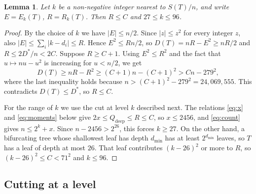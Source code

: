 \documentclass[11pt]{amsart}
\newtheorem{lemma}[theorem]{Lemma}
\theoremstyle{remark}
\begin{document}
\begin{lemma}\label{lem:center}
Let $k$ be a non-negative integer nearest to $S(T)/n$, and write $E=E_k(T)$, $R=R_k(T)$.
Then $R\le C$ and $27\le k\le96$.
\end{lemma}

\begin{proof}
By the choice of $k$ we have $|E|\le n/2$.
Since $|z|\le z^2$ for every integer $z$, also $|E|\le\sum_i|k-d_i|\le R$.
Hence $E^2\le Rn/2$, so $D(T)=nR-E^2\ge nR/2$ and $R\le 2D^*/n<2C$.
Suppose $R\ge C+1$.
Using $E^2\le R^2$ and the fact that $u\mapsto nu-u^2$ is increasing for $u<n/2$, we get
\[
D(T)\ge nR-R^2\ge (C+1)n-(C+1)^2>Cn-279^2,
\]
where the last inequality holds because $n>(C+1)^2-279^2=24{,}069{,}555$.
This contradicts $D(T)\le D^*$, so $R\le C$.

For the range of $k$ we use the cut at level $k$ described next.
The relations \eqref{eq:x} and \eqref{eq:moments} below give $2x\le Q_{\mathrm{deep}}\le R\le C$, so $x\le2456$, and \eqref{eq:count} gives $n\le 2^k+x$.
Since $n-2456>2^{26}$, this forces $k\ge27$.
On the other hand, a bifurcating tree whose shallowest leaf has depth $d_{\min}$ has at least $2^{d_{\min}}$ leaves, so $T$ has a leaf of depth at most $26$.
That leaf contributes $(k-26)^2$ or more to $R$, so $(k-26)^2\le C<71^2$ and $k\le96$.
\end{proof}

\subsection{Cutting at a level}
\end{document}
